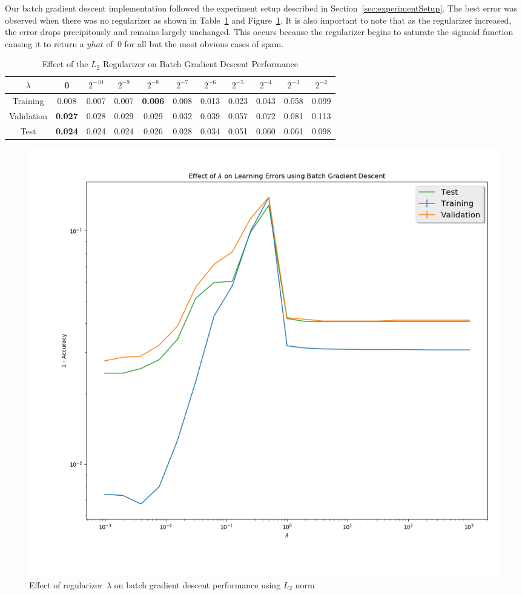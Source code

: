 \documentclass{report}
\begin{document}
  Our batch gradient descent implementation followed the experiment setup described in Section~\ref{sec:experimentSetup}.  The best error was observed when there was no regularizer as shown in Table~\ref{tab:batchGradientDescentL2} and Figure~\ref{fig:batchGdL2}.  It is also important to note that as the regularizer increased, the error drops precipitously and remains largely unchanged.  This occurs because the regularizer begins to saturate the sigmoid function causing it to return a $yhat$ of~$0$ for all but the most obvious cases of spam.
    
  \begin{table}[]
    \centering
    \caption{Effect of the $L_2$ Regularizer on Batch Gradient Descent Performance}
    \label{tab:batchGradientDescentL2}
    \begin{tabular}{c||c|c|c|c|c|c|c|c|c|c}
      \hline
      $\lambda$  & 0              & $2^{-10}$ & $2^{-9}$ & $2^{-8}$       & $2^{-7}$ & $2^{-6}$ & $2^{-5}$ & $2^{-4}$ & $2^{-3}$ & $2^{-2}$ \\ \hline
      Training   & 0.008          & 0.007     & 0.007    & \textbf{0.006} & 0.008    & 0.013    & 0.023    & 0.043    & 0.058    & 0.099    \\ \hline
      Validation & \textbf{0.027} & 0.028    & 0.029    & 0.029          & 0.032    & 0.039    & 0.057    & 0.072    & 0.081    & 0.113    \\ \hline
      Test       & \textbf{0.024} & 0.024     & 0.024    & 0.026          & 0.028    & 0.034    & 0.051    & 0.060    & 0.061    & 0.098    \\ \hline
    \end{tabular}
  \end{table}


  \begin{figure}
    \centering
    \includegraphics[scale=.3]{batch_GD_L2Norm}
    \caption{Effect of regularizer~$\lambda$ on batch gradient descent performance using $L_2$ norm}\label{fig:batchGdL2}
  \end{figure}
    
\end{document}
